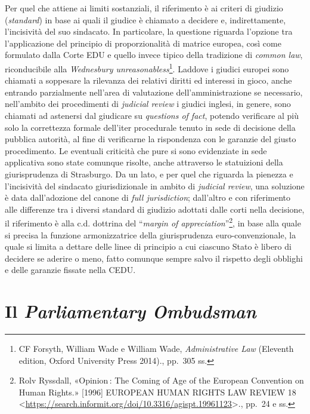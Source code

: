\documentclass[12pt,it,a4paper,]{report}
\begin{document}
Per quel che attiene ai limiti sostanziali, il riferimento è ai criteri
di giudizio (\emph{standard}) in base ai quali il giudice è chiamato a
decidere e, indirettamente, l'incisività del suo sindacato. In
particolare, la questione riguarda l'opzione tra l'applicazione del
principio di proporzionalità di matrice europea, così come formulato
dalla Corte EDU e quello invece tipico della tradizione di \emph{common
law}, riconducibile alla \emph{Wednesbury unreasonabless}\footnote{{CF
  Forsyth, William Wade e William Wade, \emph{Administrative Law}
  (Eleventh edition, {Oxford University Press} 2014).}, pp.~305 ss.}.
Laddove i giudici europei sono chiamati a soppesare la rilevanza dei
relativi diritti ed interessi in gioco, anche entrando parzialmente
nell'area di valutazione dell'amministrazione se necessario, nell'ambito
dei procedimenti di \emph{judicial review} i giudici inglesi, in genere,
sono chiamati ad astenersi dal giudicare su \emph{questions of fact},
potendo verificare al più solo la correttezza formale dell'iter
procedurale tenuto in sede di decisione della pubblica autorità, al fine
di verificarne la rispondenza con le garanzie del giusto procedimento.
Le eventuali criticità che pure si sono evidenziate in sede applicativa
sono state comunque risolte, anche attraverso le statuizioni della
giurisprudenza di Strasburgo. Da un lato, e per quel che riguarda la
pienezza e l'incisività del sindacato giurisdizionale in ambito di
\emph{judicial review}, una soluzione è data dall'adozione del canone di
\emph{full jurisdiction}; dall'altro e con riferimento alle differenze
tra i diversi standard di giudizio adottati dalle corti nella decisione,
il riferimento è alla c.d. dottrina del ``\emph{margin of
appreciation}''\footnote{{Rolv Ryssdall, {«Opinion : The Coming of Age
  of the {European Convention} on {Human Rights}.»} {[}1996{]} EUROPEAN
  HUMAN RIGHTS LAW REVIEW 18
  \textless{}\url{https://search.informit.org/doi/10.3316/agispt.19961123}\textgreater.},
  pp.~24 e ss.}, in base alla quale si precisa la funzione
armonizzatrice della giurisprudenza euro-convenzionale, la quale si
limita a dettare delle linee di principio a cui ciascuno Stato è libero
di decidere se aderire o meno, fatto comunque sempre salvo il rispetto
degli obblighi e delle garanzie fissate nella CEDU.

\hypertarget{il-parliamentary-ombudsman}{%
\section{\texorpdfstring{Il \emph{Parliamentary
Ombudsman}}{Il Parliamentary Ombudsman}}\label{il-parliamentary-ombudsman}}
\end{document}
